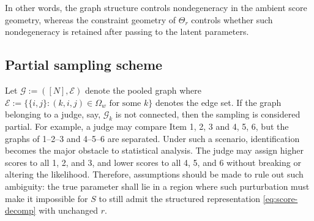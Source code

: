\documentclass{article}
\begin{document}
\begin{bibunit}[unsrtnat]
\begin{remark}
In other words, the graph structure controls nondegeneracy in the ambient score geometry, whereas the constraint geometry of \(\Theta_r\) controls whether such nondegeneracy is retained after passing to the latent parameters.
\end{remark}


\subsection{Partial sampling scheme} \label{subsec:partial-sample}


Let $\mathcal{G}:=([N],\mathcal{E})$ denote the pooled graph where $\mathcal{E}:=\{\{i,j\}:(k,i,j)\in\Omega_w\text{ for some }k\}$ denotes the edge set. If the graph belonging to a judge, say, $\mathcal{G}_k$ is not connected, then the sampling is considered partial. 
For example, a judge may compare Item 1, 2, 3 and 4, 5, 6, but the graphs of 1--2--3 and 4--5--6 are separated. Under such a scenario, identification becomes the major obstacle to statistical analysis. The judge may assign higher scores to all 1, 2, and 3, and lower scores to all 4, 5, and 6 without breaking  or altering the likelihood. Therefore, assumptions should be made to rule out such ambiguity: the true parameter shall lie in a region where such purturbation must make it impossible for $S$ to still admit the structured representation \eqref{eq:score-decomp} with unchanged $r$. 


\end{bibunit}
\end{document}
